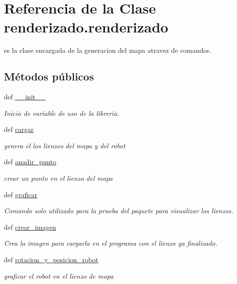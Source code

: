 \hypertarget{classrenderizado_1_1renderizado}{
\section{Referencia de la Clase renderizado.renderizado}
\label{classrenderizado_1_1renderizado}
}


es la clase encargada de la generacion del mapa atravez de comandos.  


\subsection*{Métodos públicos}
\begin{DoxyCompactItemize}
\item 
def \hyperlink{classrenderizado_1_1renderizado_a4c17dcbfcfe999944d4bb4829b833b66}{\_\-\_\-init\_\-\_\-}
\begin{DoxyCompactList}\small\item\em Inicio de variable de uso de la libreria. \end{DoxyCompactList}\item 
def \hyperlink{classrenderizado_1_1renderizado_a64752e268753f383d7b9d252070c65f4}{cargar}
\begin{DoxyCompactList}\small\item\em genera el los lienzos del mapa y del robot \end{DoxyCompactList}\item 
def \hyperlink{classrenderizado_1_1renderizado_a52891772883b0606be993163a87b70ae}{anadir\_\-punto}
\begin{DoxyCompactList}\small\item\em crear un punto en el lienzo del mapa \end{DoxyCompactList}\item 
def \hyperlink{classrenderizado_1_1renderizado_a43054b88bb47c71371321e31c406003e}{graficar}
\begin{DoxyCompactList}\small\item\em Comando solo utilizado para la prueba del paquete para visualizar los lienzos. \end{DoxyCompactList}\item 
def \hyperlink{classrenderizado_1_1renderizado_a890510a320079ad0fee8e2e87adda69e}{crear\_\-imagen}
\begin{DoxyCompactList}\small\item\em Crea la imagen para cargarla en el programa con el lienzo ya finalizado. \end{DoxyCompactList}\item 
def \hyperlink{classrenderizado_1_1renderizado_a1b2c9f08cee1a5ee13e0e130f598efc0}{rotacion\_\-y\_\-posicion\_\-robot}
\begin{DoxyCompactList}\small\item\em graficar el robot en el lienzo de mapa \end{DoxyCompactList}\end{DoxyCompactItemize}
